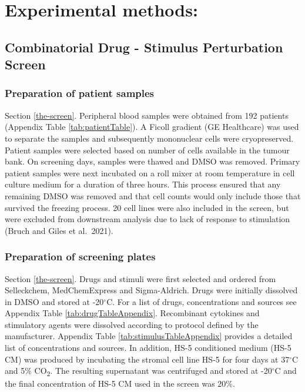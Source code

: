 \documentclass[11pt, a4paper, twosided]{book}
\begin{document}
\hypertarget{experimental-methods}{%
\section{Experimental methods:}\label{experimental-methods}}

\hypertarget{combinatorial-drug---stimulus-perturbation-screen}{%
\subsection{Combinatorial Drug - Stimulus Perturbation Screen}\label{combinatorial-drug---stimulus-perturbation-screen}}

\hypertarget{preparation-of-patient-samples}{%
\subsubsection{Preparation of patient samples}\label{preparation-of-patient-samples}}

Section \ref{the-screen}. Peripheral blood samples were obtained from 192 patients (Appendix Table \ref{tab:patientTable}). A Ficoll gradient (GE Healthcare) was used to separate the samples and subsequently mononuclear cells were cryopreserved. Patient samples were selected based on number of cells available in the tumour bank. On screening days, samples were thawed and DMSO was removed. Primary patient samples were next incubated on a roll mixer at room temperature in cell culture medium for a duration of three hours. This process ensured that any remaining DMSO was removed and that cell counts would only include those that survived the freezing process. 20 cell lines were also included in the screen, but were excluded from downstream analysis due to lack of response to stimulation (Bruch and Giles et al.~2021).

\hypertarget{preparation-of-screening-plates}{%
\subsubsection{Preparation of screening plates}\label{preparation-of-screening-plates}}

Section \ref{the-screen}. Drugs and stimuli were first selected and ordered from Selleckchem, MedChemExpress and Sigma-Aldrich. Drugs were initially dissolved in DMSO and stored at -20\(^\circ\)C. For a list of drugs, concentrations and sources see Appendix Table \ref{tab:drugTableAppendix}. Recombinant cytokines and stimulatory agents were dissolved according to protocol defined by the manufacturer. Appendix Table \ref{tab:stimulusTableAppendix} provides a detailed list of concentrations and sources. In addition, HS-5 conditioned medium (HS-5 CM) was produced by incubating the stromal cell line HS-5 for four days at 37\(^\circ\)C and 5\% CO\textsubscript{2}. The resulting supernatant was centrifuged and stored at -20\(^\circ\)C and the final concentration of HS-5 CM used in the screen was 20\%.
\end{document}
